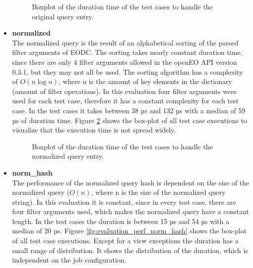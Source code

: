 \documentclass[draft,final]{vutinfth} %
\begin{document}
\begin{itemize}
\begin{figure}[!h]
		\centering
		\caption{Boxplot of the duration time of the test cases to handle the original query entry.}
		\label{fig:evaluation_perf_original}
	\end{figure}
	\item \textbf{normalized} \\
	The normalized query is the result of an alphabetical sorting of the parsed filter arguments of EODC. The sorting takes nearly constant duration time, since there are only 4 filter arguments allowed in the openEO API version 0.3.1, but they may not all be used. The sorting algorithm has a complexity of $O(n\log{}n)$, where n is the amount of key elements in the dictionary (amount of filter operations). In this evaluation four filter arguments were used for each test case, therefore it has a constant complexity for each test case. In the test cases it takes between 38 µs and 132 µs with a median of 59 µs of duration time. Figure \ref{fig:evaluation_perf_normalized} shows the box-plot of all test case executions to visualize that the execution time is not spread widely.  
	\begin{figure}[!h]
		\centering
		\caption{Boxplot of the duration time of the test cases to handle the normalized query entry.}
		\label{fig:evaluation_perf_normalized}
	\end{figure}
	\item \textbf{norm\_hash} \\
	The performance of the normalized query hash is dependent on the size of the normalized query ($O(n)$, where n is the size of the normalized query string). In this evaluation it is constant, since in every test case, there are four filter arguments used, which makes the normalized query have a constant length. In the test cases the duration is between 15 µs and 54 µs with a median of 20 µs. Figure \ref{fig:evaluation_perf_norm_hash} shows the box-plot of all test case executions. Except for a view exceptions the duration has a small range of distribution. It shows the distribution of the duration, which is independent on the job configuration. 

\end{itemize}
\end{document}
